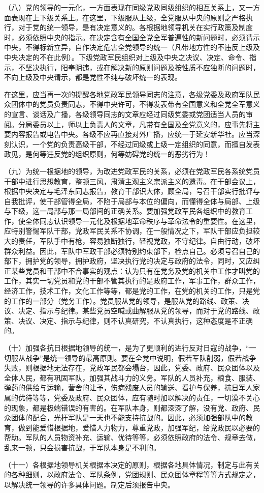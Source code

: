 （八）党的领导的一元化，一方面表现在同级党政同级组织的相互关系上，又一方面表现在上下级关系上。在这里，下级服从上级，全党服从中央的原则之严格执行，对于党的统一领导，是有决定意义的。各根据地领导机关在实行政策及制度时，必须依照中央的指示。在决定含有全国全党全军普遍性的新问题时，必须请示中央，不得标新立异，自作决定危害全党领导的统一（凡带地方性的不违反上级及中央决定的不在此例）。下级党政军民组织对上级及中央之决议、决定、命令、指示，不坚决执行，阳奉阴违，或在解决新的原则问题及按性质不应独断的问题时，不向上级及中央请示，都是党性不纯与破坏统一的表现。

在这里，应当再一次的提醒各地党政军民领导同志的注意，各级党委及政府军队民众团体中的党员负责同志，不得中央许可，不得发表带有全国意义和全党全军意义的宣言、谈话及广播，各级领导同志的文章应经过同级党委或党团适当人员的审阅。分局委员以上，师以上负责人的文章，凡带有全国及全党意义的，应事先将主要内容报告或电告中央。各级不应再直接对外广播，应统一于延安新华社。应当深刻认识，一个党的负责高级干部，不经过同级或上级一定组织的同意，而擅自发表政见，是何等违反党的组织原则，何等妨碍党的统一的恶劣行为！

（九）为统一根据地的领导，为改进党政军民的关系，必须在党政军民各系统党员干部中进行思想教育，整顿三风，肃清主观主义宗派主义的遗毒。在干部会议上，根据中央决定与毛泽东同志报告，教育干部识大体，顾全局，号召干部实行批评与自我批评，使干部管得全局，不陷于局部与本位的偏向，而懂得全体与局部、上级与下级，这一局部与那一局部间的正确关系。要加强党政军民各组织中的教育工作，使全体同志认识领导一元化及根据地革命秩序与革命法令的重要性。在这里，应特别警惕军队干部，党政军民关系不协调，在一般情况之下，军队干部应负担较大的责任，军队手中有枪，容易独断独行，轻视党政，不守纪律。自由行动，破坏群众利益。因此，军队中军政干部必须特别约束部下，检点自己。必须号召自己的部下，拥护党的领导，拥护政府，坚决执行党的决定与政府的法令，同时，又应纠正某些党员和干部中不合事实的观点：认为只有在党务及党的机关中工作才叫党的工作，其实一切党员和党的干部不管其执行的是政府工作，军事工作，群众工作，经济工作，技术工作，文化工作等等，都是党的工作，在党的机关的工作，只是党的工作的一部分（党务工作）。党员服从党的领导，是服从党的路线、政策、决议、决定、指示与纪律。某些党员空喊或曲解服从党的领导，而对于党的路线、政策、决议、决定、指示与纪律，则不认真研究，不认真执行，这种态度是不正确的。

（十）加强各抗日根据地领导的统一，是为了更顺利的进行反对日寇的战争，“一切服从战争”是统一领导的最高原则。要在全党中说明，假若军队削弱，假若战争失败，则根据地无法存在，党政军民都会塌台，因此，党委、政府、民众团体以及全体人民，都有巩固军队，加强其战斗力的义务。军队的人员补充，粮食、服装、弹药的供给与运输，营舍的让予，伤病残废人员的输送、看护与保养，抗日军人家属的优待等等，党委及政府、民众团体，应有随时加以解决的责任，一切漠不关心的现象，都是极端错误的有害的。在军队本身，则都深深了解，没有党、政府、民众团体的配合，光杆军队是一天也不能支持抗战的。因此，必须加强部队中的教育，做到能爱惜根据地，爱惜人力物力，尊重党政，加强军纪，给党政民以必要的帮助。军队的人员物资补充、运输、优待等等，必须依照政府的法令、规章去做，乱来一顿，只会损害抗战，于军队本身是不利的。

（十一）各根据地领导机关根据本决定的原则，根据各地具体情况，制定与此有关的各种细则，以政府法令、军队条例，党团规则、民众团体章程等等方式规定之，以解决统一领导的许多具体问题。制定后须报告中央。

